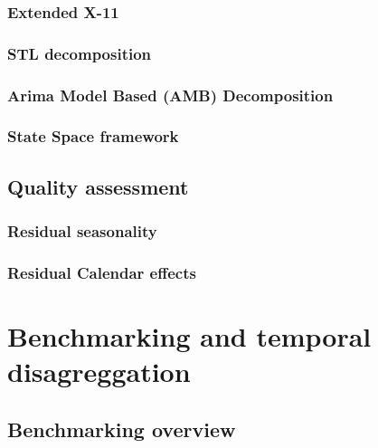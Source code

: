 \documentclass[
  letterpaper,
  DIV=11,
  numbers=noendperiod]{scrreprt}
\begin{document}
\hypertarget{extended-x-11}{%
\subsection{Extended X-11}\label{extended-x-11}}

\hypertarget{stl-decomposition}{%
\subsection{STL decomposition}\label{stl-decomposition}}

\hypertarget{arima-model-based-amb-decomposition}{%
\subsection{Arima Model Based (AMB)
Decomposition}\label{arima-model-based-amb-decomposition}}

\hypertarget{state-space-framework}{%
\subsection{State Space framework}\label{state-space-framework}}

\hypertarget{quality-assessment-1}{%
\section{Quality assessment}\label{quality-assessment-1}}

\hypertarget{residual-seasonality-1}{%
\subsection{Residual seasonality}\label{residual-seasonality-1}}

\hypertarget{residual-calendar-effects-1}{%
\subsection{Residual Calendar
effects}\label{residual-calendar-effects-1}}

\hypertarget{benchmarking-and-temporal-disagreggation}{%
\chapter{Benchmarking and temporal
disagreggation}\label{benchmarking-and-temporal-disagreggation}}

\hypertarget{benchmarking-overview}{%
\section{Benchmarking overview}\label{benchmarking-overview}}
\end{document}
